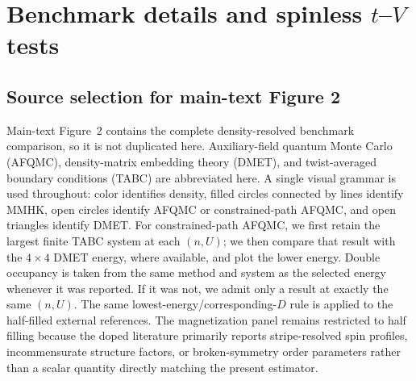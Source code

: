 \documentclass[10pt]{article}
\begin{document}
\section{Benchmark details and spinless $t$--$V$ tests}
\subsection{Source selection for main-text Figure 2}
Main-text Figure~2 contains the complete density-resolved benchmark comparison, so it is not duplicated here. Auxiliary-field quantum Monte Carlo (AFQMC), density-matrix embedding theory (DMET), and twist-averaged boundary conditions (TABC) are abbreviated here. A single visual grammar is used throughout: color identifies density, filled circles connected by lines identify MMHK, open circles identify AFQMC or constrained-path AFQMC, and open triangles identify DMET. For constrained-path AFQMC, we first retain the largest finite TABC system at each $(n,U)$; we then compare that result with the $4\times4$ DMET energy, where available, and plot the lower energy. Double occupancy is taken from the same method and system as the selected energy whenever it was reported. If it was not, we admit only a result at exactly the same $(n,U)$. The same lowest-energy/corresponding-$D$ rule is applied to the half-filled external references. The magnetization panel remains restricted to half filling because the doped literature primarily reports stripe-resolved spin profiles, incommensurate structure factors, or broken-symmetry order parameters rather than a scalar quantity directly matching the present estimator.
\end{document}
